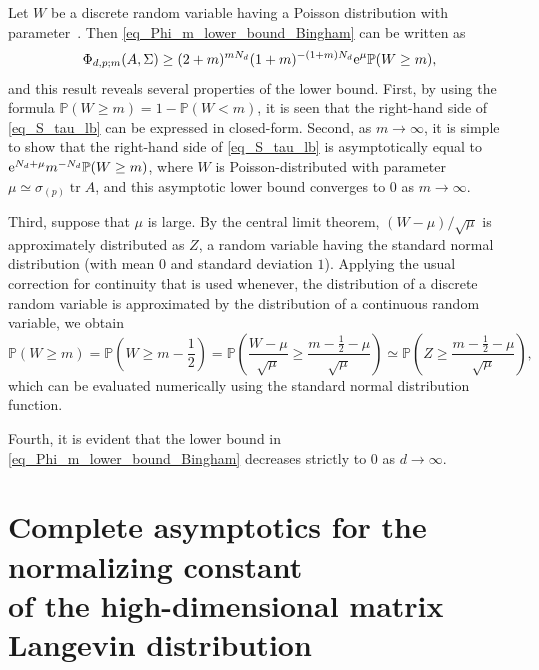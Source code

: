 \documentclass[pdftex]{sigma}
\numberwithin{equation}{section}
\def\tr {\mathop{\mathrm{tr}}}
\begin{document}
\begin{Remark}
\label{rem_Phi_m_lower_bound_Bingham}
Let $W$ be a discrete random variable having a Poisson distribution with parameter~\smash{$\mu = \bigl(\frac{1+m}{2+m}\bigr)^{N_d} \sigma_{(p)} \tr A$}.
Then \eqref{eq_Phi_m_lower_bound_Bingham} can be written as
\begin{equation}
\label{eq_S_tau_lb}
\Phi_{d,p;m}(A,\Sigma) \ge (2+m)^{mN_d} (1+m)^{-(1+m)N_d} {\rm e}^{\mu} \mathbb{P}(W \ge m),
\end{equation}
and this result reveals several properties of the lower bound. First, by using the formula
${\mathbb{P}(W \ge m) = 1 - \mathbb{P}(W < m)}$,
it is seen that the right-hand side of \eqref{eq_S_tau_lb} can be expressed in closed-form. Second, as $m \to \infty$, it is simple to show that the right-hand side of \eqref{eq_S_tau_lb} is asymptotically equal to ${\rm e}^{N_d+\mu} m^{-N_d} \mathbb{P}(W \ge m)$, where $W$ is Poisson-distributed with parameter~${\mu \simeq \sigma_{(p)}\tr A}$, and this asymptotic lower bound converges to $0$ as $m \to \infty$.

Third, suppose that $\mu$ is large. By the central limit theorem, $(W-\mu)/\sqrt{\mu}$ is approximately distributed as $Z$, a random variable having the standard normal distribution (with mean $0$ and standard deviation $1$). Applying the usual correction for continuity that is used whenever, the distribution of a discrete random variable is approximated by the distribution of a continuous random variable, we obtain
\[
\mathbb{P}(W \ge m) = \mathbb{P}\left(W \ge m-\frac12\right) = \mathbb{P}\left(\frac{W-\mu}{\sqrt{\mu}} \ge \frac{m-\tfrac12-\mu}{\sqrt{\mu}}\right) \simeq \mathbb{P}\left(Z \ge \frac{m-\tfrac12-\mu}{\sqrt{\mu}}\right),
\]
which can be evaluated numerically using the standard normal distribution function.

Fourth, it is evident that the lower bound in \eqref{eq_Phi_m_lower_bound_Bingham} decreases strictly to $0$ as $d \to \infty$.

\end{Remark}


\section[Complete asymptotics for the normalizing constant of the high-dimensional matrix Langevin distribution]{Complete asymptotics for the normalizing constant\\ of the high-dimensional matrix Langevin distribution}
\label{sec_matrix_langevin}
\end{document}
